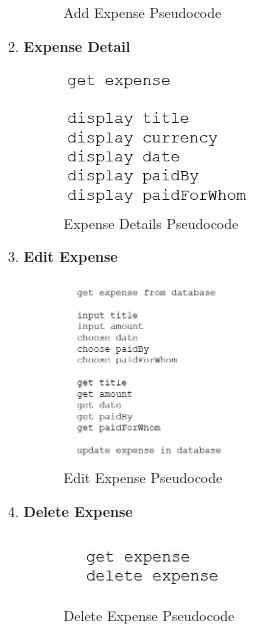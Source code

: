 \documentclass[conference]{IEEEtran}
\begin{document}
\begin{enumerate}
\begin{enumerate}
\begin{figure}[h!]
                    \caption{Add Expense Pseudocode}
                    \label{fig:my_label}
                \end{figure}
            \item \textbf{Expense Detail}
                \begin{figure}[h!]
                    \centerline{\includegraphics[width=50mm,scale=0.5]{img/pseudocode/pseudocode-expense.png}}
                    \caption{Expense Details Pseudocode}
                    \label{fig:my_label}
                \end{figure}
            \item \textbf{Edit Expense}
                \begin{figure}[h!]
                    \centerline{\includegraphics[width=50mm,scale=0.5]{img/pseudocode/pseudocode-edit_expense.jpg}}
                    \caption{Edit Expense Pseudocode}
                    \label{fig:my_label}
                \end{figure}
            \item \textbf{Delete Expense}
                \begin{figure}[h!]
                    \centerline{\includegraphics[width=50mm,scale=0.5]{img/pseudocode/pseudocode-delete_expense.jpg}}
                    \caption{Delete Expense Pseudocode}
                    \label{fig:my_label}
                \end{figure}
                \newline \newline

\end{enumerate}
\end{enumerate}
\end{document}
